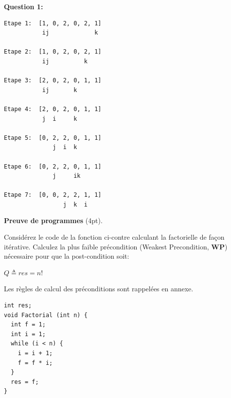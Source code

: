 \documentclass[10pt]{article}\usepackage[nu]{esial}
\begin{document}
\begin{minipage}{.28\linewidth}
\begin{Reponse}
\noindent\textbf{Question 1:} 
\begin{Verbatim}[numbers=none]
Etape 1:  [1, 0, 2, 0, 2, 1]
           ij             k

Etape 2:  [1, 0, 2, 0, 2, 1]
           ij          k   

Etape 3:  [2, 0, 2, 0, 1, 1]
           ij       k

Etape 4:  [2, 0, 2, 0, 1, 1]
           j  i     k

Etape 5:  [0, 2, 2, 0, 1, 1]
              j  i  k

Etape 6:  [0, 2, 2, 0, 1, 1]
              j     ik

Etape 7:  [0, 0, 2, 2, 1, 1]
                 j  k  i
\end{Verbatim}
\end{Reponse}
\end{minipage}

\bigskip\Exercice\textbf{Preuve de programmes} (4pt).

\noindent\begin{minipage}{.73\linewidth}
  Considérez le code de la fonction ci-contre calculant la factorielle de façon
  itérative. Calculez la plus faible précondition (Weakest Precondition,
  \textbf{WP}) nécessaire pour que la post-condition soit:

  \begin{center}
    $Q \triangleq res = n!$
  \end{center}

  Les règles de calcul des préconditions sont rappelées en annexe.
\end{minipage}\hfill\begin{minipage}{.24\linewidth}
\begin{Verbatim}[numbers=right]
int res;
void Factorial (int n) {
  int f = 1;
  int i = 1;
  while (i < n) {
    i = i + 1;
    f = f * i;
  }
  res = f;
}
\end{Verbatim}  
\end{minipage}
\end{document}
